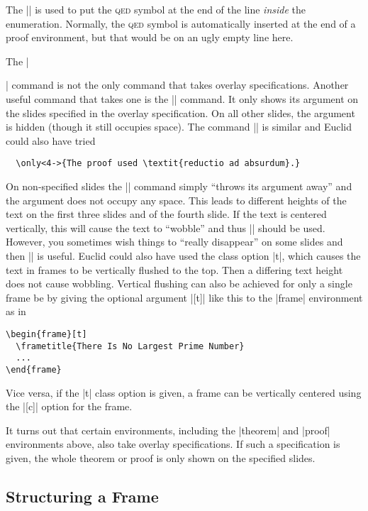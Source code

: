 The |\qedhere| is used to put the \textsc{qed} symbol at the end of
the line \emph{inside} the enumeration. Normally, the \textsc{qed}
symbol is automatically inserted at the end of a proof environment,
but that would be on an ugly empty line here.

The |\item| command is not the only command that takes overlay
specifications. Another useful command that takes one is the
|\uncover| command. It only shows its argument on the slides specified
in the overlay specification. On all other slides, the argument is
hidden (though it still occupies space). The command |\only| is
similar and Euclid could also have tried
\begin{verbatim}
  \only<4->{The proof used \textit{reductio ad absurdum}.}
\end{verbatim}
On non-specified slides the |\only| command simply ``throws its
argument away'' and the argument does not occupy any space. This leads
to different heights of the text on the first three slides and of the
fourth slide. If the text is centered vertically, this will cause the
text to ``wobble'' and thus |\uncover| should be used. However, you
sometimes wish things to ``really disappear'' on some slides and then
|\only| is useful. Euclid could also have used the class option
|t|, which causes the text in frames to be vertically flushed
to the top. Then a differing text height does not cause
wobbling. Vertical flushing can also be achieved for only a single
frame be by giving the optional argument |[t]| like this to the
|frame| environment as in
\begin{verbatim}
\begin{frame}[t]
  \frametitle{There Is No Largest Prime Number}
  ...
\end{frame}
\end{verbatim}
Vice versa, if the |t| class option is given, a frame can be
vertically centered using the |[c]| option for the frame.

It turns out that certain environments, including the |theorem| and
|proof| environments above, also take overlay specifications. If such
a specification is given, the whole theorem or proof is only shown on
the specified slides.


\subsection{Structuring a Frame}

